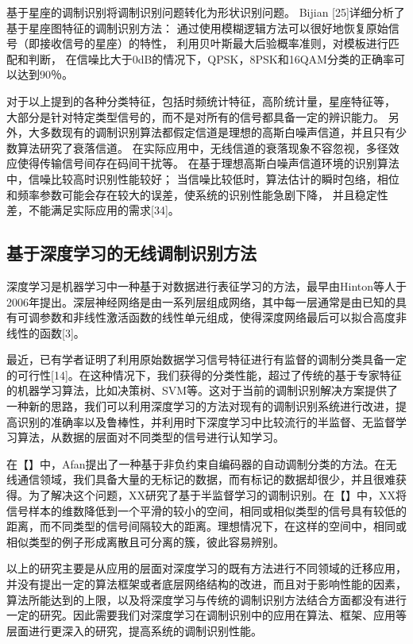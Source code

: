 基于星座的调制识别将调制识别问题转化为形状识别问题。
Bijian [25]详细分析了基于星座图特征的调制识别方法：
通过使用模糊逻辑方法可以很好地恢复原始信号（即接收信号的星座）的特性，
利用贝叶斯最大后验概率准则，对模板进行匹配和判断，
在信噪比大于0dB的情况下，QPSK，8PSK和16QAM分类的正确率可以达到90％。\par
 
对于以上提到的各种分类特征，包括时频统计特征，高阶统计量，星座特征等，
大部分是针对特定类型信号的，而不是对所有的信号都具备一定的辨识能力。
另外，大多数现有的调制识别算法都假定信道是理想的高斯白噪声信道，并且只有少数算法研究了衰落信道。
在实际应用中，无线信道的衰落现象不容忽视，多径效应使得传输信号间存在码间干扰等。
在基于理想高斯白噪声信道环境的识别算法中，信噪比较高时识别性能较好；
当信噪比较低时，算法估计的瞬时包络，相位和频率参数可能会存在较大的误差，使系统的识别性能急剧下降，
并且稳定性差，不能满足实际应用的需求[34]。\par

\subsection{基于深度学习的无线调制识别方法}
深度学习是机器学习中一种基于对数据进行表征学习的方法，最早由Hinton等人于2006年提出。深层神经网络是由一系列层组成网络，其中每一层通常是由已知的具有可调参数和非线性激活函数的线性单元组成，使得深度网络最后可以拟合高度非线性的函数[3]。\par

最近，已有学者证明了利用原始数据学习信号特征进行有监督的调制分类具备一定的可行性[14]。在这种情况下，我们获得的分类性能，超过了传统的基于专家特征的机器学习算法，比如决策树、SVM等。这对于当前的调制识别解决方案提供了一种新的思路，我们可以利用深度学习的方法对现有的调制识别系统进行改进，提高识别的准确率以及鲁棒性，并利用时下深度学习中比较流行的半监督、无监督学习算法，从数据的层面对不同类型的信号进行认知学习。\par

在【】中，Afan提出了一种基于非负约束自编码器的自动调制分类的方法。在无线通信领域，我们具备大量的无标记的数据，而有标记的数据却很少，并且很难获得。为了解决这个问题，XX研究了基于半监督学习的调制识别。在【】中，XX将信号样本的维数降低到一个平滑的较小的空间，相同或相似类型的信号具有较低的距离，而不同类型的信号间隔较大的距离。理想情况下，在这样的空间中，相同或相似类型的例子形成离散且可分离的簇，彼此容易辨别。\par

以上的研究主要是从应用的层面对深度学习的既有方法进行不同领域的迁移应用，并没有提出一定的算法框架或者底层网络结构的改进，而且对于影响性能的因素，算法所能达到的上限，以及将深度学习与传统的调制识别方法结合方面都没有进行一定的研究。因此需要我们对深度学习在调制识别中的应用在算法、框架、应用等层面进行更深入的研究，提高系统的调制识别性能。\par

